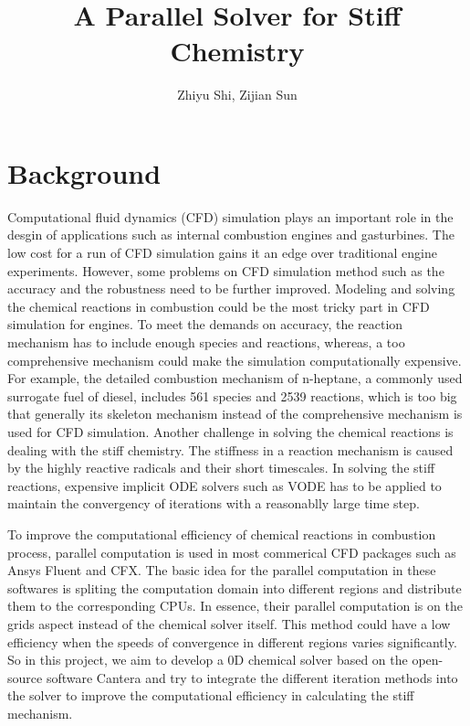 \documentclass{article}
\title{A Parallel Solver for Stiff Chemistry}
\author{Zhiyu Shi, Zijian Sun}
\date{}
\begin{document}
\maketitle
\section{Background}

\qquad Computational fluid dynamics (CFD) simulation plays an important role in the desgin of applications such as internal combustion engines and gasturbines.
The low cost for a run of CFD simulation gains it an edge over traditional engine experiments.
However, some problems on CFD simulation method such as the accuracy and the robustness need to be further improved.
Modeling and solving the chemical reactions in combustion could be the most tricky part in CFD simulation for engines.
To meet the demands on accuracy, the reaction mechanism has to include enough species and reactions,
whereas, a too comprehensive mechanism could make the simulation computationally expensive.
For example, the detailed combustion mechanism of n-heptane, a commonly used surrogate fuel of diesel,
includes 561 species and 2539 reactions\cite{bib4}, 
which is too big that generally its skeleton mechanism instead of the comprehensive mechanism is used for CFD simulation.
Another challenge in solving the chemical reactions is dealing with the stiff chemistry. 
The stiffness in a reaction mechanism is caused by the highly reactive radicals and their short timescales\cite{bib6}.
In solving the stiff reactions, expensive implicit ODE solvers such as VODE\cite{bib7} has to be applied
to maintain the convergency of iterations with a reasonablly large time step. 

To improve the computational efficiency of chemical reactions in combustion process,
 parallel computation is used in most commerical CFD packages such as Ansys Fluent\cite{fluent} and CFX\cite{cfx}.
The basic idea for the parallel computation in these softwares is spliting the computation domain into different regions
 and distribute them to the corresponding CPUs. 
In essence, their parallel computation is on the grids aspect instead of the chemical solver itself.
This method could have a low efficiency when the speeds of convergence in different regions varies significantly.
So in this project, we aim to develop a 0D chemical solver based on the open-source software Cantera\cite{cantera}
 and try to integrate the different iteration methods
 into the solver to improve the computational efficiency in calculating the stiff mechanism. 
\end{document}
